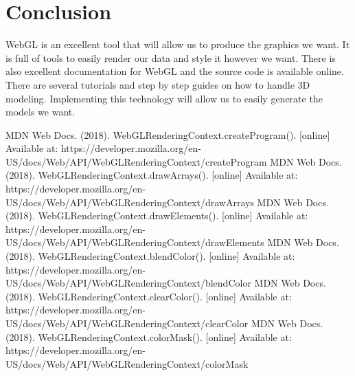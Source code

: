 \documentclass[letterpaper, 10pt] {article}
\begin{document}
\section{Conclusion}
WebGL is an excellent tool that will allow us to produce the graphics we want. It is full of tools to easily render our data and style it however we want. There is also excellent documentation for WebGL and the source code is available online. There are several tutorials and step by step guides on how to handle 3D modeling. Implementing this technology will allow us to easily generate the models we want.
\begin{thebibliography}{9}
MDN Web Docs. (2018). WebGLRenderingContext.createProgram(). [online] Available at: https://developer.mozilla.org/en-US/docs/Web/API/WebGLRenderingContext/createProgram
MDN Web Docs. (2018). WebGLRenderingContext.drawArrays(). [online] Available at: https://developer.mozilla.org/en-US/docs/Web/API/WebGLRenderingContext/drawArrays
MDN Web Docs. (2018). WebGLRenderingContext.drawElements(). [online] Available at: https://developer.mozilla.org/en-US/docs/Web/API/WebGLRenderingContext/drawElements
MDN Web Docs. (2018). WebGLRenderingContext.blendColor(). [online] Available at: https://developer.mozilla.org/en-US/docs/Web/API/WebGLRenderingContext/blendColor
MDN Web Docs. (2018). WebGLRenderingContext.clearColor(). [online] Available at: https://developer.mozilla.org/en-US/docs/Web/API/WebGLRenderingContext/clearColor
MDN Web Docs. (2018). WebGLRenderingContext.colorMask(). [online] Available at: https://developer.mozilla.org/en-US/docs/Web/API/WebGLRenderingContext/colorMask

\end{thebibliography}
\end{document}

